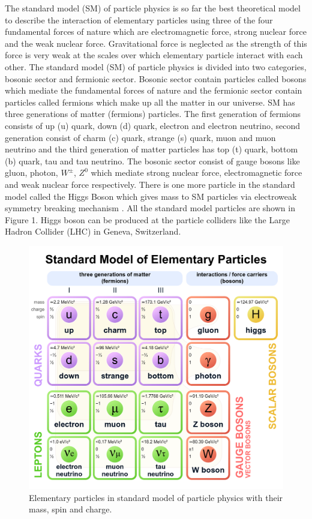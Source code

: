 \documentclass[final,3p]{CSP}
\begin{document}
\onehalfspacing The standard model (SM) of particle physics is so far the best theoretical model to describe the interaction of elementary 
particles using three of the four fundamental forces of nature which are electromagnetic force, strong nuclear force and the 
weak nuclear force. Gravitational force is neglected as the strength of this force is very weak at the scales over which 
elementary particle interact with each other. The standard model (SM) of particle physics is divided into two categories, 
bosonic sector and fermionic sector. Bosonic sector contain particles called bosons which mediate the fundamental forces of 
nature and the fermionic sector contain particles called fermions which make up all the matter in our universe. SM has three 
generations of matter (fermions) particles. The first generation of fermions consists of up (u) quark, down (d) quark, electron 
and electron neutrino, second generation consist of charm (c) quark, strange (s) quark, muon and muon neutrino and the third 
generation of matter particles has top (t) quark, bottom (b) quark, tau and tau neutrino. The bosonic sector consist of gauge 
bosons like gluon, photon, $W^{\pm}$, $Z^0$ which mediate strong nuclear force, electromagnetic force and weak nuclear force respectively. There is one more particle in the standard model called the Higgs Boson which gives mass to SM particles via electroweak symmetry breaking mechanism \cite{Chatrchyan:2012xdj}. All the standard model particles are shown in Figure 1. Higgs boson can be produced at the particle colliders like the Large Hadron Collider (LHC) in Geneva, Switzerland.

\begin{figure}[H]
	\centering
	\includegraphics[width= 0.5 \columnwidth]{./sm.png}
	\caption{Elementary particles in standard model of particle physics with their mass, spin and charge.}
	\label{figure 1}
\end{figure}
\end{document}
